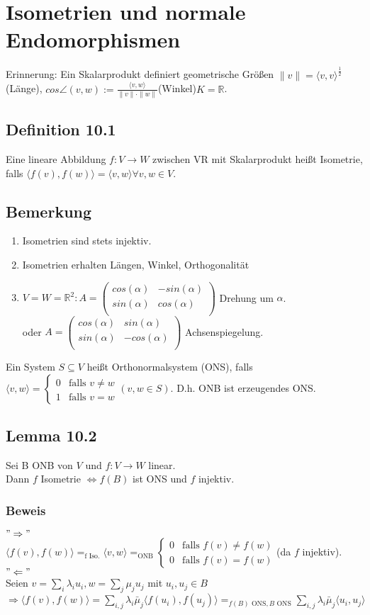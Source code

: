 \documentclass[a4paper, 12pt]{extarticle}
\newcommand{\twopartdef}[4] {
	\left\{
		\begin{array}{ll}
			#1 & #2 \\
			#3 & #4
		\end{array}
	\right.
}
\newcommand{\norm}[1]{
	\parallel #1 \parallel
}
\newcommand{\skalar}[2] {
	\langle #1, #2\rangle
}
\begin{document}
\section{Isometrien und normale Endomorphismen}
Erinnerung: Ein Skalarprodukt definiert geometrische Größen
$\norm{v} = \skalar{v}{v}^{\frac{1}{2}}$(Länge), $cos\angle(v,w) := \frac{\skalar{v}{w}}{\norm{v}\cdot \norm{w}}$(Winkel)$K = \mathbb{R}$.
\subsection*{Definition 10.1}
Eine lineare Abbildung $f: V \longrightarrow W$ zwischen VR mit Skalarprodukt heißt Isometrie, falls $\skalar{f(v)}{f(w)} = \skalar{v}{w} \forall v,w \in V$.\\
\subsection*{Bemerkung}
\begin{enumerate}[label = \alph*)]
	\item Isometrien sind stets injektiv.
	\item Isometrien erhalten Längen, Winkel, Orthogonalität
	\item $V = W = \mathbb{R}^2: A = \left( \begin{matrix}
		cos(\alpha) & -sin(\alpha) \\
		sin(\alpha) & cos(\alpha) \\
	\end{matrix}\right)$ Drehung um $\alpha$.\\
	oder $A = \left( \begin{matrix}
		cos(\alpha) & sin(\alpha) \\
		sin(\alpha) & -cos(\alpha) \\
	\end{matrix}\right)$ Achsenspiegelung.
\end{enumerate}
Ein System $S\subseteq V$ heißt Orthonormalsystem (ONS), falls $\skalar{v}{w} = \twopartdef{0}{\text{falls } v \neq w}{1}{\text{falls } v = w} (v,w\in S).$ D.h. ONB ist erzeugendes ONS.
\subsection*{Lemma 10.2}
Sei B ONB von $V$ und $f: V \longrightarrow W$ linear.\\
Dann $f$ Isometrie $\Leftrightarrow f(B)$ ist ONS und $f$ injektiv.
\subsubsection*{Beweis}
$"\Rightarrow"$\\
$\skalar{f(v)}{f(w)} =_{\text{f Iso.}} \skalar{v}{w} =_{\text{ONB}}  \twopartdef{0}{\text{falls } f(v) \neq f(w)}{0}{\text{falls } f(v) = f(w)}$(da $f$ injektiv).\\
$"\Leftarrow"$\\
Seien $v = \sum_{i}\lambda_i u_i, w= \sum_{j} \mu_j u_j$ mit $u_i, u_j \in B$\\
$\Rightarrow \skalar{f(v)}{f(w)} = \sum_{i, j} \lambda_i\bar\mu_j \skalar{f(u_i)}{f(u_j)} =_{f(B)\text{ ONS}, B \text{ ONS}} \sum_{i,j}\lambda_i\bar\mu_j \skalar{u_i}{u_j}$
\end{document}
